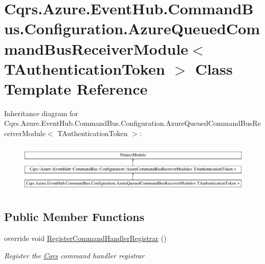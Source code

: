 \hypertarget{classCqrs_1_1Azure_1_1EventHub_1_1CommandBus_1_1Configuration_1_1AzureQueuedCommandBusReceiverModule}{}\section{Cqrs.\+Azure.\+Event\+Hub.\+Command\+Bus.\+Configuration.\+Azure\+Queued\+Command\+Bus\+Receiver\+Module$<$ T\+Authentication\+Token $>$ Class Template Reference}
\label{classCqrs_1_1Azure_1_1EventHub_1_1CommandBus_1_1Configuration_1_1AzureQueuedCommandBusReceiverModule}
Inheritance diagram for Cqrs.\+Azure.\+Event\+Hub.\+Command\+Bus.\+Configuration.\+Azure\+Queued\+Command\+Bus\+Receiver\+Module$<$ T\+Authentication\+Token $>$\+:\begin{figure}[H]
\begin{center}
\leavevmode
\includegraphics[height=2.400000cm]{classCqrs_1_1Azure_1_1EventHub_1_1CommandBus_1_1Configuration_1_1AzureQueuedCommandBusReceiverModule}
\end{center}
\end{figure}
\subsection*{Public Member Functions}
\begin{DoxyCompactItemize}
\item 
override void \hyperlink{classCqrs_1_1Azure_1_1EventHub_1_1CommandBus_1_1Configuration_1_1AzureQueuedCommandBusReceiverModule_a30d8ea5555bbb38bfddc6b5aa1e3dd1c}{Register\+Command\+Handler\+Registrar} ()
\begin{DoxyCompactList}\small\item\em Register the \hyperlink{namespaceCqrs}{Cqrs} command handler registrar \end{DoxyCompactList}\end{DoxyCompactItemize}


